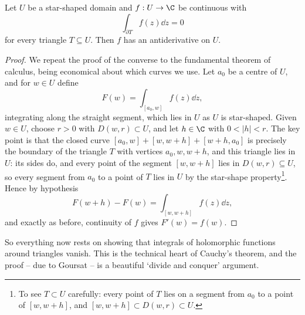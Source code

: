 \begin{corollary}
    Let $U$ be a star-shaped domain and $f: U \rightarrow \C$ be continuous with
    $$
    \int_{\partial T} f(z) \dd z = 0
    $$
    for every triangle $T \subseteq U$. Then $f$ has an antiderivative on $U$.
\end{corollary}
\begin{proof}
    We repeat the proof of the converse to the fundamental theorem of calculus, being economical about which curves we use. Let $a_0$ be a centre of $U$, and for $w \in U$ define
    $$
    F(w) = \int_{[a_0, w]} f(z) \dd z,
    $$
    integrating along the straight segment, which lies in $U$ as $U$ is star-shaped.
    Given $w \in U$, choose $r > 0$ with $D(w, r) \subset U$, and let $h \in \C$ with $0 < |h| < r$. The key point is that the closed curve $[a_0, w] + [w, w + h] + [w + h, a_0]$ is precisely the boundary of the triangle $T$ with vertices $a_0, w, w + h$, and this triangle lies in $U$: its sides do, and every point of the segment $[w, w+h]$ lies in $D(w, r) \subseteq U$, so every segment from $a_0$ to a point of $T$ lies in $U$ by the star-shape property\footnote{To see $T \subset U$ carefully: every point of $T$ lies on a segment from $a_0$ to a point of $[w, w + h]$, and $[w, w+h] \subset D(w,r) \subset U$.}. Hence by hypothesis
    $$
    F(w + h) - F(w) = \int_{[w, w + h]} f(z) \dd z,
    $$
    and exactly as before, continuity of $f$ gives $F'(w) = f(w)$.
\end{proof}

So everything now rests on showing that integrals of holomorphic functions around triangles vanish. This is the technical heart of Cauchy's theorem, and the proof -- due to Goursat -- is a beautiful `divide and conquer' argument.

